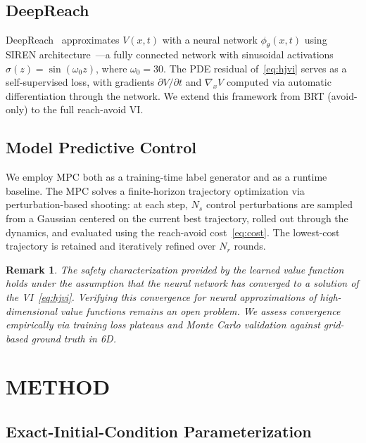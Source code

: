 \documentclass[letterpaper, 10 pt, conference]{ieeeconf}
\newtheorem{remark}{Remark}
\begin{document}
\subsection{DeepReach}

DeepReach~\cite{bansal2021deepreach} approximates $V(x,t)$ with a neural network $\phi_\theta(x,t)$ using SIREN architecture~\cite{sitzmann2020siren}---a fully connected network with sinusoidal activations $\sigma(z) = \sin(\omega_0 z)$, where $\omega_0 = 30$. The PDE residual of~\eqref{eq:hjvi} serves as a self-supervised loss, with gradients $\partial V/\partial t$ and $\nabla_x V$ computed via automatic differentiation through the network. We extend this framework from BRT (avoid-only) to the full reach-avoid VI.

\subsection{Model Predictive Control}

We employ MPC both as a training-time label generator and as a runtime baseline. The MPC solves a finite-horizon trajectory optimization via perturbation-based shooting: at each step, $N_s$ control perturbations are sampled from a Gaussian centered on the current best trajectory, rolled out through the dynamics, and evaluated using the reach-avoid cost~\eqref{eq:cost}. The lowest-cost trajectory is retained and iteratively refined over $N_r$ rounds.

\begin{remark}
The safety characterization provided by the learned value function holds under the assumption that the neural network has converged to a solution of the VI~\eqref{eq:hjvi}. Verifying this convergence for neural approximations of high-dimensional value functions remains an open problem. We assess convergence empirically via training loss plateaus and Monte Carlo validation against grid-based ground truth in 6D.
\end{remark}

\section{METHOD}

\subsection{Exact-Initial-Condition Parameterization}
\end{document}
